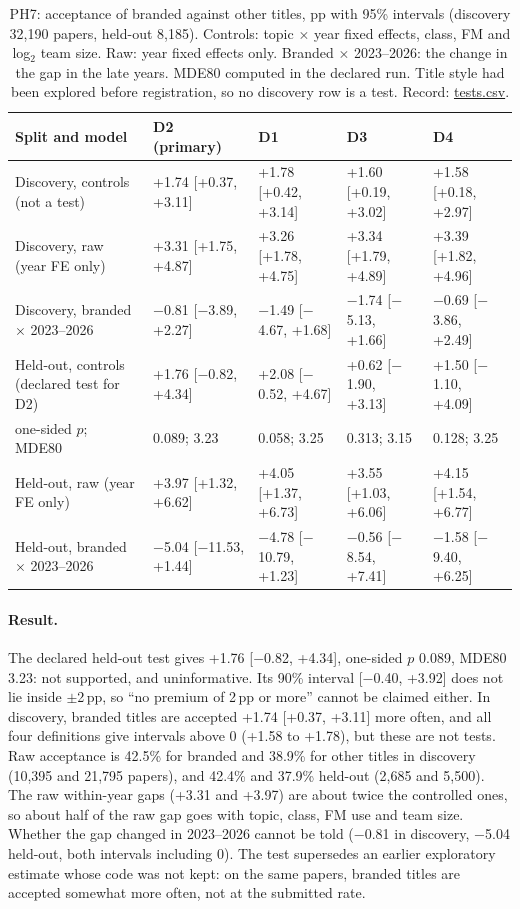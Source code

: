 \begin{table}[t]
\centering\footnotesize
\setlength{\tabcolsep}{3pt}
\begin{tabularx}{\textwidth}{@{}>{\raggedright\arraybackslash}X llll@{}}
\toprule
Split and model & D2 (primary) & D1 & D3 & D4 \\
\midrule
Discovery, controls (not a test) & +1.74 [+0.37, +3.11] & +1.78 [+0.42, +3.14] & +1.60 [+0.19, +3.02] & +1.58 [+0.18, +2.97] \\
Discovery, raw (year FE only) & +3.31 [+1.75, +4.87] & +3.26 [+1.78, +4.75] & +3.34 [+1.79, +4.89] & +3.39 [+1.82, +4.96] \\
Discovery, branded $\times$ 2023--2026 & $-$0.81 [$-$3.89, +2.27] & $-$1.49 [$-$4.67, +1.68] & $-$1.74 [$-$5.13, +1.66] & $-$0.69 [$-$3.86, +2.49] \\
Held-out, controls (declared test for D2) & +1.76 [$-$0.82, +4.34] & +2.08 [$-$0.52, +4.67] & +0.62 [$-$1.90, +3.13] & +1.50 [$-$1.10, +4.09] \\
\quad one-sided $p$; MDE80 & 0.089; 3.23 & 0.058; 3.25 & 0.313; 3.15 & 0.128; 3.25 \\
Held-out, raw (year FE only) & +3.97 [+1.32, +6.62] & +4.05 [+1.37, +6.73] & +3.55 [+1.03, +6.06] & +4.15 [+1.54, +6.77] \\
Held-out, branded $\times$ 2023--2026 & $-$5.04 [$-$11.53, +1.44] & $-$4.78 [$-$10.79, +1.23] & $-$0.56 [$-$8.54, +7.41] & $-$1.58 [$-$9.40, +6.25] \\
\bottomrule
\end{tabularx}
\caption{PH7: acceptance of branded against other titles, pp with 95\% intervals (discovery 32,190 papers, held-out
8,185). Controls: topic $\times$ year fixed effects, class, FM and log$_2$ team size. Raw: year fixed effects only.
Branded $\times$ 2023--2026: the change in the gap in the late years. MDE80 computed in the declared run. Title style
had been explored before registration, so no discovery row is a test. Record: \url{tests.csv}.}
\label{tab:app-ph7}
\end{table}

\paragraph{Result.} The declared held-out test gives +1.76 [$-$0.82, +4.34], one-sided $p$ 0.089, MDE80 3.23: not
supported, and uninformative. Its 90\% interval [$-$0.40, +3.92] does not lie inside $\pm$2\,pp, so ``no premium of
2\,pp or more'' cannot be claimed either. In discovery, branded titles are accepted +1.74 [+0.37, +3.11] more often,
and all four definitions give intervals above 0 (+1.58 to +1.78), but these are not tests. Raw acceptance is 42.5\%
for branded and 38.9\% for other titles in discovery (10,395 and 21,795 papers), and 42.4\% and 37.9\% held-out (2,685
and 5,500). The raw within-year gaps (+3.31 and +3.97) are about twice the controlled ones, so about half of the raw
gap goes with topic, class, FM use and team size. Whether the gap changed in 2023--2026 cannot be told ($-$0.81 in
discovery, $-$5.04 held-out, both intervals including 0). The test supersedes an earlier exploratory estimate whose
code was not kept: on the same papers, branded titles are accepted somewhat more often, not at the submitted rate.

